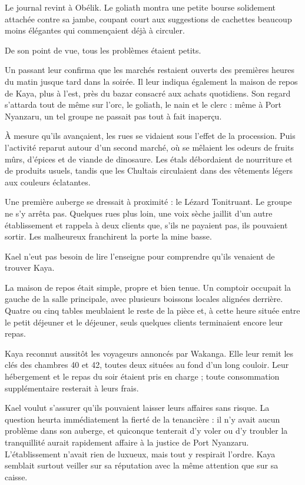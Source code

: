 Le journal revint à Obélik. Le goliath montra une petite bourse solidement attachée contre sa jambe, coupant court aux suggestions de cachettes beaucoup moins élégantes qui commençaient déjà à circuler.

\begin{narrateur}

De son point de vue, tous les problèmes étaient petits.

\end{narrateur}

Un passant leur confirma que les marchés restaient ouverts des premières heures du matin jusque tard dans la soirée. Il leur indiqua également la maison de repos de Kaya, plus à l'est, près du bazar consacré aux achats quotidiens. Son regard s'attarda tout de même sur l'orc, le goliath, le nain et le clerc : même à Port Nyanzaru, un tel groupe ne passait pas tout à fait inaperçu.

À mesure qu'ils avançaient, les rues se vidaient sous l'effet de la procession. Puis l'activité reparut autour d'un second marché, où se mêlaient les odeurs de fruits mûrs, d'épices et de viande de dinosaure. Les étals débordaient de nourriture et de produits usuels, tandis que les Chultais circulaient dans des vêtements légers aux couleurs éclatantes.

Une première auberge se dressait à proximité : le Lézard Tonitruant. Le groupe ne s'y arrêta pas. Quelques rues plus loin, une voix sèche jaillit d'un autre établissement et rappela à deux clients que, s'ils ne payaient pas, ils pouvaient sortir. Les malheureux franchirent la porte la mine basse.

Kael n'eut pas besoin de lire l'enseigne pour comprendre qu'ils venaient de trouver Kaya.

\scenebreak

La maison de repos était simple, propre et bien tenue. Un comptoir occupait la gauche de la salle principale, avec plusieurs boissons locales alignées derrière. Quatre ou cinq tables meublaient le reste de la pièce et, à cette heure située entre le petit déjeuner et le déjeuner, seuls quelques clients terminaient encore leur repas.

Kaya reconnut aussitôt les voyageurs annoncés par Wakanga. Elle leur remit les clés des chambres 40 et 42, toutes deux situées au fond d'un long couloir. Leur hébergement et le repas du soir étaient pris en charge ; toute consommation supplémentaire resterait à leurs frais.

Kael voulut s'assurer qu'ils pouvaient laisser leurs affaires sans risque. La question heurta immédiatement la fierté de la tenancière : il n'y avait aucun problème dans son auberge, et quiconque tenterait d'y voler ou d'y troubler la tranquillité aurait rapidement affaire à la justice de Port Nyanzaru. L'établissement n'avait rien de luxueux, mais tout y respirait l'ordre. Kaya semblait surtout veiller sur sa réputation avec la même attention que sur sa caisse.

